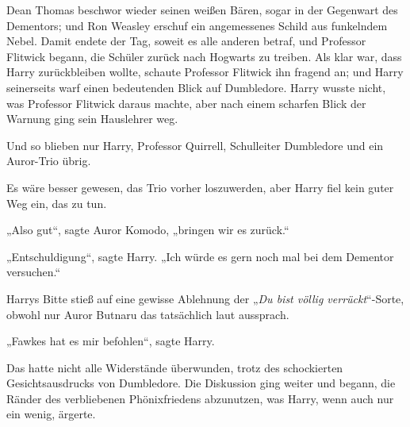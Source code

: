 Dean Thomas beschwor wieder seinen weißen Bären, sogar in der Gegenwart des Dementors; und Ron Weasley erschuf ein angemessenes Schild aus funkelndem Nebel. Damit endete der Tag, soweit es alle anderen betraf, und Professor Flitwick begann, die Schüler zurück nach Hogwarts zu treiben. Als klar war, dass Harry zurückbleiben wollte, schaute Professor Flitwick ihn fragend an; und Harry seinerseits warf einen bedeutenden Blick auf Dumbledore. Harry wusste nicht, was Professor Flitwick daraus machte, aber nach einem scharfen Blick der Warnung ging sein Hauslehrer weg.

Und so blieben nur Harry, Professor Quirrell, Schulleiter Dumbledore und ein Auror-Trio übrig.

Es wäre besser gewesen, das Trio vorher loszuwerden, aber Harry fiel kein guter Weg ein, das zu tun.

„Also gut“, sagte Auror Komodo, „bringen wir es zurück.“

„Entschuldigung“, sagte Harry. „Ich würde es gern noch mal bei dem Dementor versuchen.“

\later

Harrys Bitte stieß auf eine gewisse Ablehnung der „\emph{Du bist völlig verrückt}“-Sorte, obwohl nur Auror Butnaru das tatsächlich laut aussprach.

„Fawkes hat es mir befohlen“, sagte Harry.

Das hatte nicht alle Widerstände überwunden, trotz des schockierten Gesichtsausdrucks von Dumbledore. Die Diskussion ging weiter und begann, die Ränder des verbliebenen Phönixfriedens abzunutzen, was Harry, wenn auch nur ein wenig, ärgerte.

